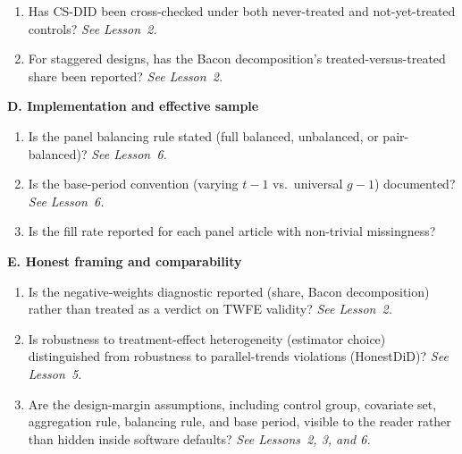 \begin{tcolorbox}
\begin{enumerate}[leftmargin=1.6em,itemsep=0.25em,label=\arabic*.,start=7]
\item Has CS-DID been cross-checked under both never-treated and not-yet-treated controls? \textit{See Lesson~2.}

\item For staggered designs, has the Bacon decomposition's treated-versus-treated share been reported? \textit{See Lesson~2.}
\end{enumerate}

\textbf{D. Implementation and effective sample}

\vspace{0.3em}
\begin{enumerate}[leftmargin=1.6em,itemsep=0.25em,label=\arabic*.,start=10]
\item Is the panel balancing rule stated (full balanced, unbalanced, or pair-balanced)? \textit{See Lesson~6.}

\item Is the base-period convention (varying $t-1$ vs.\ universal $g-1$) documented? \textit{See Lesson~6.}

\item Is the fill rate reported for each panel article with non-trivial missingness?
\end{enumerate}

\textbf{E. Honest framing and comparability}

\vspace{0.3em}
\begin{enumerate}[leftmargin=1.6em,itemsep=0.25em,label=\arabic*.,start=13]
\item Is the negative-weights diagnostic reported (share, Bacon decomposition) rather than treated as a verdict on TWFE validity? \textit{See Lesson~2.}

\item Is robustness to treatment-effect heterogeneity (estimator choice) distinguished from robustness to parallel-trends violations (HonestDiD)? \textit{See Lesson~5.}

\item Are the design-margin assumptions, including control group, covariate set, aggregation rule, balancing rule, and base period, visible to the reader rather than hidden inside software defaults? \textit{See Lessons~2, 3, and 6.}
\end{enumerate}
\end{tcolorbox}



